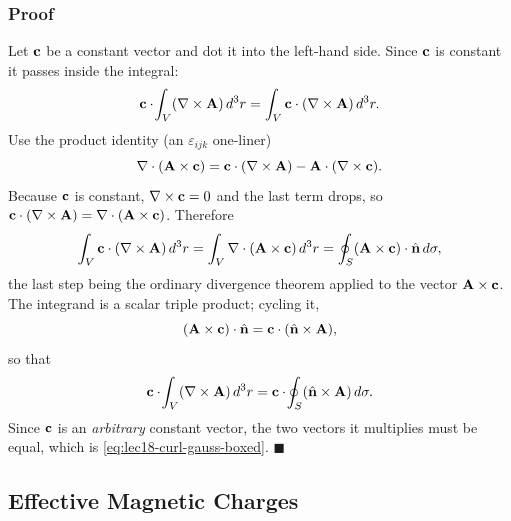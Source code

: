 \subsubsection*{Proof}
Let $\mathbf{c}$ be a constant vector and dot it into the left-hand side. Since $\mathbf{c}$
is constant it passes inside the integral:
\begin{equation}\label{eq:lec18-cdot-curl}
  \mathbf{c}\cdot\!\int_V (\nabla\times\mathbf{A})\,d^3r
  =\int_V \mathbf{c}\cdot(\nabla\times\mathbf{A})\,d^3r.
\end{equation}
Use the product identity (an $\varepsilon_{ijk}$ one-liner)
\begin{equation}\label{eq:lec18-vec-identity}
  \nabla \cdot(\mathbf{A}\times\mathbf{c})
  =\mathbf{c}\cdot(\nabla\times\mathbf{A})-\mathbf{A}\cdot(\nabla\times\mathbf{c}).
\end{equation}
Because $\mathbf{c}$ is constant, $\nabla\times\mathbf{c}=0$ and the last term drops, so
$\mathbf{c}\cdot(\nabla\times\mathbf{A})=\nabla \cdot(\mathbf{A}\times\mathbf{c})$. Therefore
\begin{equation}\label{eq:lec18-apply-divthm}
  \int_V \mathbf{c}\cdot(\nabla\times\mathbf{A})\,d^3r
  =\int_V \nabla \cdot(\mathbf{A}\times\mathbf{c})\,d^3r
  =\oint_S (\mathbf{A}\times\mathbf{c})\cdot\hat{\mathbf{n}}\,d\sigma,
\end{equation}
the last step being the ordinary divergence theorem applied to the vector
$\mathbf{A}\times\mathbf{c}$. The integrand is a scalar triple product; cycling it,
\begin{equation}\label{eq:lec18-cyclic}
  (\mathbf{A}\times\mathbf{c})\cdot\hat{\mathbf{n}}
  =\mathbf{c}\cdot(\hat{\mathbf{n}}\times\mathbf{A}),
\end{equation}
so that
\begin{equation}\label{eq:lec18-cancel-c}
  \mathbf{c}\cdot\!\int_V (\nabla\times\mathbf{A})\,d^3r
  =\mathbf{c}\cdot\!\oint_S (\hat{\mathbf{n}}\times\mathbf{A})\,d\sigma.
\end{equation}
Since $\mathbf{c}$ is an \emph{arbitrary} constant vector, the two vectors it multiplies
must be equal, which is \eqref{eq:lec18-curl-gauss-boxed}. $\blacksquare$


\subsection{Effective Magnetic Charges}\label{subsec:lec18-magnetic-charges}

